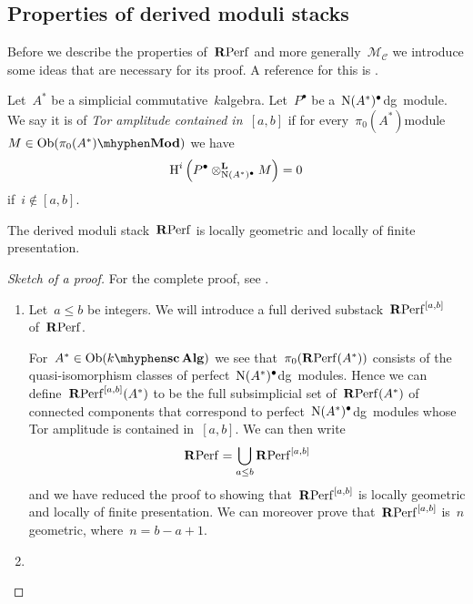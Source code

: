 \begin{refsection}
\section{Properties of derived moduli stacks}
\label{section:properties}
Before we describe the properties of~$\mathbf{R}\mathrm{Perf}$ and more generally~$\mathcal{M}_{\mathcal{C}}$ we introduce some ideas that are necessary for its proof. A reference for this is \cite[expos\'es I--III]{sga6}.
\begin{definition}
  Let~$A^*$ be a simplicial commutative~$k$\dash algebra. Let~$P^\bullet$ be a~$\operatorname{N}(A^*)^\bullet$\dash dg~module. We say it is of \emph{Tor amplitude contained in~$[a,b]$} if for every~$\pi_0(A^*)$\dash module~$M\in\Ob(\pi_0(A^*)\mhyphen\Mod)$ we have
  \begin{equation}
    \operatorname{H}^i\left( P^\bullet\otimes_{\operatorname{N}(A^*)^\bullet}^{\mathbf{L}} M \right)=0
  \end{equation}
  if~$i\notin[a,b]$.
\end{definition}

\begin{theorem}
  \label{theorem:main-theorem-RPerf}
  The derived moduli stack~$\mathbf{R}\mathrm{Perf}$ is locally geometric and locally of finite presentation.

  \begin{proof}[Sketch of a proof]
    For the complete proof, see \cite[proposition 3.7]{toen-vaquie}.
    \begin{enumerate}
      \item Let~$a\leq b$ be integers. We will introduce a full derived substack~$\mathbf{R}\mathrm{Perf}^{[a,b]}$ of~$\mathbf{R}\mathrm{Perf}$.
        
        For~$A^*\in\Ob(\scAlg{k})$ we see that~$\pi_0(\mathbf{R}\mathrm{Perf}(A^*))$ consists of the quasi-isomorphism classes of perfect~$\operatorname{N}(A^*)^\bullet$\dash dg~modules. Hence we can define~$\mathbf{R}\mathrm{Perf}^{[a,b]}(A^*)$ to be the full subsimplicial set of~$\mathbf{R}\mathrm{Perf}(A^*)$ of connected components that correspond to perfect~$\operatorname{N}(A^*)^\bullet$\dash dg~modules whose Tor amplitude is contained in~$[a,b]$. We can then write
        \begin{equation}
          \mathbf{R}\mathrm{Perf}=\bigcup_{a\leq b}\mathbf{R}\mathrm{Perf}^{[a,b]}
        \end{equation}
        and we have reduced the proof to showing that~$\mathbf{R}\mathrm{Perf}^{[a,b]}$ is locally geometric and locally of finite presentation. We can moreover prove that~$\mathbf{R}\mathrm{Perf}^{[a,b]}$ is~$n$\dash geometric, where~$n=b-a+1$.

      \item 
    \end{enumerate}
  \end{proof}
\end{theorem}


\end{refsection}
